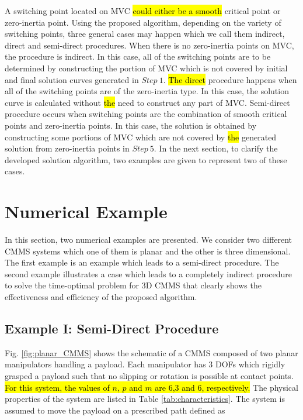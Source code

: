 \documentclass{rob}%
\begin{document}
A switching point located on MVC \hl{could either be a smooth} critical point or zero-inertia point. Using the proposed algorithm, depending on the variety of switching points, three general cases may happen which we call them indirect, direct and semi-direct procedures.
When there is no zero-inertia points on MVC, the procedure is indirect. In this case, all of the switching points are to be determined by constructing the portion of MVC which is not covered by initial and final solution curves generated in $ Step \ 1 $.
\hl{The direct} procedure happens when all of the switching points are of the zero-inertia type. In this case, the solution curve is calculated without \hl{the} need to construct any part of MVC.
Semi-direct procedure occurs when switching points are the combination of smooth critical points and zero-inertia points. In this case, the solution is obtained by constructing some portions of MVC which are not covered by \hl{the} generated solution from zero-inertia points in $ Step \ 5 $.
In the next section, to clarify the developed solution algorithm, two examples are given to represent two of these cases.

\section{Numerical Example}
\label{sec:Exm}

In this section, two numerical examples are presented. We consider two different CMMS systems which one of them is planar and the other is three dimensional.
The first example is an example which leads to a semi-direct procedure.
The second example illustrates a case which leads to a completely indirect procedure to solve the time-optimal problem for 3D CMMS that clearly shows the effectiveness and efficiency of the proposed algorithm.

\subsection{Example I: Semi-Direct Procedure}
\label{subsec:Exm_1}

Fig. \ref{fig:planar_CMMS} shows the schematic of a CMMS composed of two planar manipulators handling a payload. Each manipulator has 3 DOFs which rigidly grasped a payload such that no slipping or rotation is possible at contact points. \hl{For this system, the values of $ n $, $ p $ and $ m $ are 6,3 and 6, respectively.} The physical properties of the system are listed in Table \ref{tab:characteristics}. The system is assumed to move the payload on a prescribed path defined as
\end{document}

